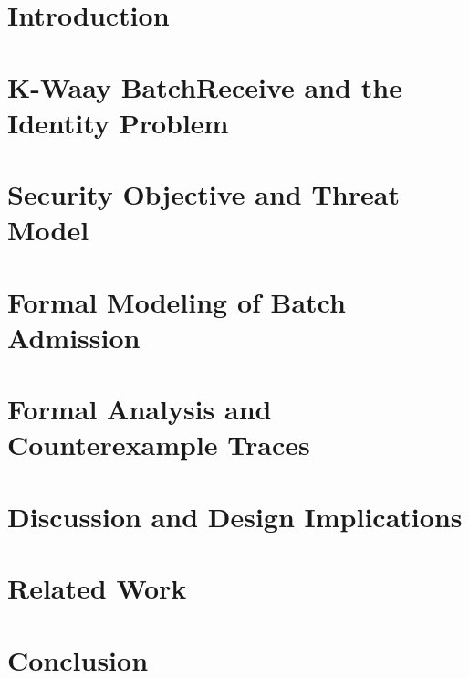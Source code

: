 

\section{Introduction}


\section{K-Waay BatchReceive and the Identity Problem}


\section{Security Objective and Threat Model}


\section{Formal Modeling of Batch Admission}


\section{Formal Analysis and Counterexample Traces}


\section{Discussion and Design Implications}


\section{Related Work}


\section{Conclusion}






